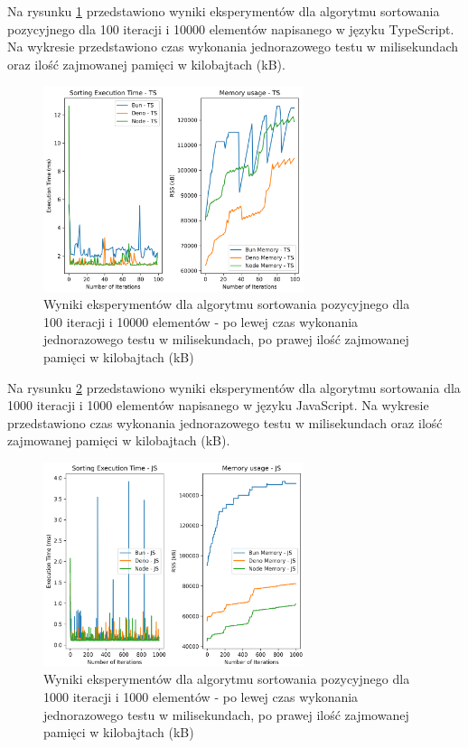 Na rysunku \ref{fig:radix_sorting_e2_ts} przedstawiono wyniki eksperymentów dla algorytmu sortowania pozycyjnego dla 100 iteracji i 10000 elementów napisanego w języku TypeScript. Na wykresie przedstawiono czas wykonania jednorazowego testu w milisekundach oraz ilość zajmowanej pamięci w kilobajtach (kB).

\begin{figure}[H]
  \centering
  \includegraphics[width=0.68\textwidth]{Figures/sorting/sorting_radix_100_10000_ts.png}
  \caption{Wyniki eksperymentów dla algorytmu sortowania pozycyjnego dla 100 iteracji i 10000 elementów - po lewej czas wykonania jednorazowego testu w milisekundach, po prawej ilość zajmowanej pamięci w kilobajtach (kB)}
  \label{fig:radix_sorting_e2_ts}
\end{figure}

Na rysunku \ref{fig:radix_sorting_e3} przedstawiono wyniki eksperymentów dla algorytmu sortowania  dla 1000 iteracji i 1000 elementów napisanego w języku JavaScript. Na wykresie przedstawiono czas wykonania jednorazowego testu w milisekundach oraz ilość zajmowanej pamięci w kilobajtach (kB).

\begin{figure}[H]
  \centering
  \includegraphics[width=0.68\textwidth]{Figures/sorting/sorting_radix_1000_1000_js.png}
  \caption{Wyniki eksperymentów dla algorytmu sortowania pozycyjnego dla 1000 iteracji i 1000 elementów - po lewej czas wykonania jednorazowego testu w milisekundach, po prawej ilość zajmowanej pamięci w kilobajtach (kB)}
  \label{fig:radix_sorting_e3}
\end{figure}

